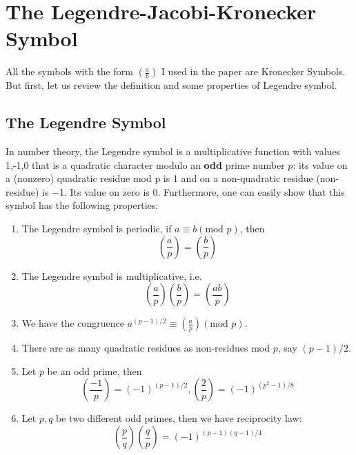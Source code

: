 \chapter{The Legendre-Jacobi-Kronecker Symbol}
\label{chap:appA}
All the symbols with the form $\left(\frac{a}{b}\right)$ I used in the paper are Kronecker Symbols. But first, let us review the definition and some properties of Legendre symbol.
\section{The Legendre Symbol}
In number theory, the Legendre symbol is a multiplicative function with values {1,-1,0} that is a quadratic character modulo an \textbf{odd} prime number $p$: its value on a (nonzero) quadratic residue mod p is 1 and on a non-quadratic residue (non-residue) is −1. Its value on zero is 0. 
Furthermore, one can easily show that this symbol has the following properties:
\begin{proposition}
\begin{enumerate}
\item The Legendre symbol is periodic, if $a\equiv b(\text{mod }p)$, then $$\left(\frac{a}{p}\right)=\left(\frac{b}{p}\right)$$
\item The Legendre symbol is multiplicative, i.e. $$\left(\frac{a}{p}\right)\left(\frac{b}{p}\right)=\left(\frac{a b}{p}\right)$$
\item We have the congruence $a^{(p-1)/2}\equiv \left(\frac{a}{p}\right)(\text{mod }p).$
\item There are as many quadratic residues as non-residues mod $p$, say $(p-1)/2$.
\item Let $p$ be an odd prime, then $$\left(\frac{-1}{p}\right)=(-1)^{(p-1)/2}, \left(\frac{2}{p}\right)=(-1)^{(p^2-1)/8}$$
\item Let $p,q$ be two different odd primes, then we have reciprocity law: $$\left(\frac{p}{q}\right)\left(\frac{q}{p}\right)=(-1)^{(p-1)(q-1)/4}$$
\end{enumerate}
\end{proposition}

